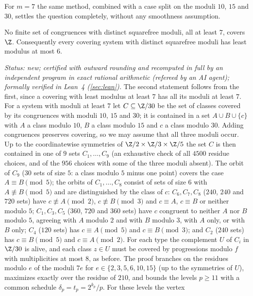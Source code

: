 For $m=7$ the same method, combined with a case split on the moduli $10$, $15$ and $30$, settles the question
completely, without any smoothness assumption.

\begin{theorem}\label{thm:sf7type}
No finite set of congruences with distinct squarefree moduli, all at least $7$, covers $\Z$. Consequently every
covering system with distinct squarefree moduli has least modulus at most $6$.
\end{theorem}

\emph{Status: new; certified with outward rounding and recomputed in full by an independent program in exact
rational arithmetic (refereed by an AI agent); formally verified in Lean~4 (\cref{sec:lean}).} The second statement
follows from the first, since
a covering with least modulus at least $7$ has all its moduli at least $7$. For a system with moduli at least $7$ let
$C\subseteq\Z/30$ be the set of classes covered by its congruences with moduli $10$, $15$ and $30$; it is contained
in a set $A\cup B\cup\{c\}$ with $A$ a class modulo $10$, $B$ a class modulo $15$ and $c$ a class modulo $30$. Adding
congruences preserves covering, so we may assume that all three moduli occur. Up to the coordinatewise symmetries of
$\Z/2\times\Z/3\times\Z/5$ the set $C$ is then contained in one of $9$ sets $C_1,\dots,C_9$ (an exhaustive check of
all $4500$ residue choices, and of the $956$ choices with some of the three moduli absent). The orbit of $C_9$ ($30$
sets of size $5$: a class modulo $5$ minus one point) covers the case $A\equiv B\pmod 5$; the orbits of
$C_1,\dots,C_8$ consist of sets of size $6$ with $A\not\equiv B\pmod 5$ and are distinguished by the class of $c$:
$C_6,C_7,C_8$ ($240$, $240$ and $720$ sets) have $c\not\equiv A\pmod 2$, $c\not\equiv B\pmod 3$ and $c\equiv A$,
$c\equiv B$ or neither modulo $5$; $C_1,C_3,C_5$ ($360$, $720$ and $360$ sets) have $c$ congruent to neither $A$ nor
$B$ modulo $5$, agreeing with $A$ modulo $2$ and with $B$ modulo $3$, with $A$ only, or with $B$ only; $C_4$ ($120$
sets) has $c\equiv A\pmod 5$ and $c\equiv B\pmod 3$; and $C_2$ ($240$ sets) has $c\equiv B\pmod 5$ and $c\equiv
A\pmod 2$. For each type the complement $U$ of $C_i$ in $\Z/30$ is alive, and each class $z\in U$ must be covered by
progressions modulo $f$ with multiplicities at most $8$, as before. The proof branches on the residues modulo $e$ of
the moduli $7e$ for $e\in\{2,3,5,6,10,15\}$ (up to the symmetries of $U$), maximizes exactly over the residue of
$210$, and bounds the levels $p\ge11$ with a common schedule $\delta_p=t_p=2^{k_p}/p$. For these levels the vertex
